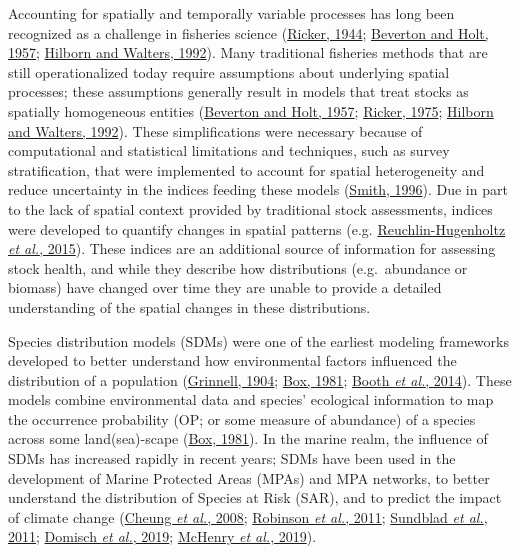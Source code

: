 \documentclass[
]{article}
\begin{document}
Accounting for spatially and temporally variable processes has long been recognized as a challenge in fisheries science (\protect\hyperlink{ref-rickerFurtherNotesFishing1944}{Ricker, 1944}; \protect\hyperlink{ref-bevertonDynamicsExploitedFish1957}{Beverton and Holt, 1957}; \protect\hyperlink{ref-hilbornQuantitativeFisheriesStock1992}{Hilborn and Walters, 1992}). Many traditional fisheries methods that are still operationalized today require assumptions about underlying spatial processes; these assumptions generally result in models that treat stocks as spatially homogeneous entities (\protect\hyperlink{ref-bevertonDynamicsExploitedFish1957}{Beverton and Holt, 1957}; \protect\hyperlink{ref-rickerComputationInterpretationBiological1975}{Ricker, 1975}; \protect\hyperlink{ref-hilbornQuantitativeFisheriesStock1992}{Hilborn and Walters, 1992}). These simplifications were necessary because of computational and statistical limitations and techniques, such as survey stratification, that were implemented to account for spatial heterogeneity and reduce uncertainty in the indices feeding these models (\protect\hyperlink{ref-smithAnalysisDataBottom1996}{Smith, 1996}). Due in part to the lack of spatial context provided by traditional stock assessments, indices were developed to quantify changes in spatial patterns (e.g. \protect\hyperlink{ref-reuchlin-hugenholtzPotentialSpatialDistribution2015}{Reuchlin-Hugenholtz \emph{et al.}, 2015}). These indices are an additional source of information for assessing stock health, and while they describe how distributions (e.g.~abundance or biomass) have changed over time they are unable to provide a detailed understanding of the spatial changes in these distributions.

Species distribution models (SDMs) were one of the earliest modeling frameworks developed to better understand how environmental factors influenced the distribution of a population (\protect\hyperlink{ref-grinnellOriginDistributionChestNutBacked1904}{Grinnell, 1904}; \protect\hyperlink{ref-boxPredictingPhysiognomicVegetation1981}{Box, 1981}; \protect\hyperlink{ref-boothBioclimFirstSpecies2014}{Booth \emph{et al.}, 2014}). These models combine environmental data and species' ecological information to map the occurrence probability (OP; or some measure of abundance) of a species across some land(sea)-scape (\protect\hyperlink{ref-boxPredictingPhysiognomicVegetation1981}{Box, 1981}). In the marine realm, the influence of SDMs has increased rapidly in recent years; SDMs have been used in the development of Marine Protected Areas (MPAs) and MPA networks, to better understand the distribution of Species at Risk (SAR), and to predict the impact of climate change (\protect\hyperlink{ref-cheungApplicationMacroecologicalTheory2008}{Cheung \emph{et al.}, 2008}; \protect\hyperlink{ref-robinsonPushingLimitsMarine2011}{Robinson \emph{et al.}, 2011}; \protect\hyperlink{ref-sundbladEcologicalCoherenceMarine2011}{Sundblad \emph{et al.}, 2011}; \protect\hyperlink{ref-domischSpatiallyExplicitSpecies2019}{Domisch \emph{et al.}, 2019}; \protect\hyperlink{ref-mchenryProjectingMarineSpecies2019}{McHenry \emph{et al.}, 2019}).
\end{document}
